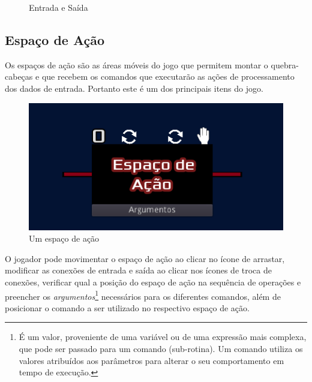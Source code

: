\begin{figure}[H]
\begin{minipage}{.4\textwidth}
    \end{minipage}
    \caption{Entrada e Saída}
\end{figure}

\subsection{Espaço de Ação}

Os espaços de ação são as áreas móveis do jogo que permitem montar o 
quebra-cabeças e que recebem os comandos que executarão as ações de 
processamento dos dados de entrada. Portanto este é um dos principais itens do 
jogo.

\begin{figure}[H]
    \includegraphics[width=\textwidth]{../figuras/espaco_acao.png}
    \caption{Um espaço de ação}
\end{figure}
\newpage
O jogador pode movimentar o espaço de ação ao clicar no ícone de arrastar, 
modificar as conexões de entrada e saída ao clicar nos ícones de troca de 
conexões, verificar qual a posição do espaço de ação na sequência de 
operações e preencher os \textit{argumentos}\footnote{É um valor, proveniente 
de uma variável ou de uma expressão mais complexa, que pode ser passado para 
um comando (sub-rotina). Um comando utiliza os valores atribuídos aos 
parâmetros para alterar o seu comportamento em tempo de execução.}
necessários para os diferentes comandos, além de posicionar o comando a ser 
utilizado no respectivo espaço de ação.

